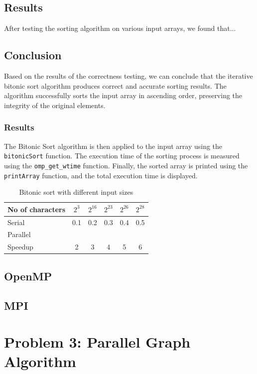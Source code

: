 \subsection*{Results}

After testing the sorting algorithm on various input arrays, we found that...


\subsection*{Conclusion}

Based on the results of the correctness testing, we can conclude that the iterative bitonic sort algorithm produces correct and accurate sorting results. The algorithm successfully sorts the input array in ascending order, preserving the integrity of the original elements.




\subsubsection*{Results}
The Bitonic Sort algorithm is then applied to the input array using the \texttt{bitonicSort} function. The execution time of the sorting process is measured using the \texttt{omp\_get\_wtime} function. Finally, the sorted array is printed using the \texttt{printArray} function, and the total execution time is displayed.
\begin{table}[htb]
	\centering
	\caption{Bitonic sort with different input sizes}\label{tab:example}
	\begin{tabular}{l|ccccc}
		\toprule
		No of characters & $2^3$ & $2^{16}$ & $2^{23}$ & $2^{26}$ & $2^{28}$\\
		\midrule
		Serial &0.1&0.2&0.3&0.4&0.5\\
		Parallel &&&&\\
		Speedup &2&3&4&5&6\\
		\bottomrule
	\end{tabular}
\end{table} 
\subsection{OpenMP} 
\subsection{MPI}
\pagebreak
\section{Problem 3: Parallel Graph Algorithm}
